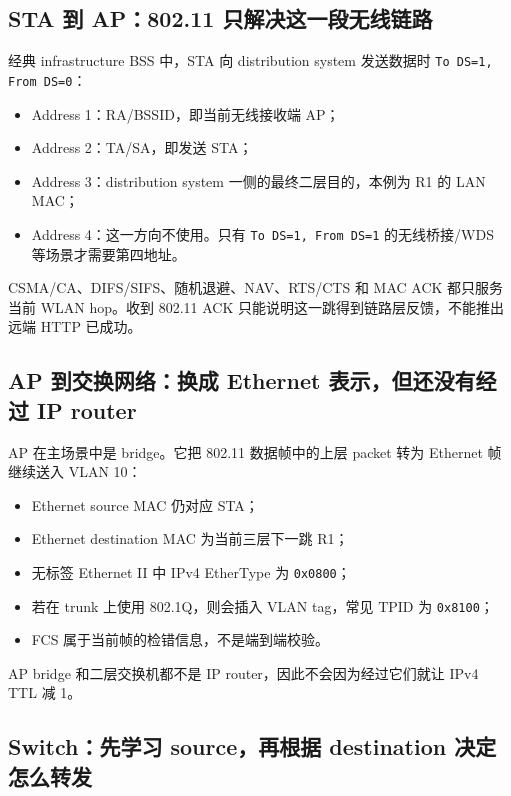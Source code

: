 \documentclass[UTF8,fontset=none,11pt,a4paper]{ctexart}
\begin{document}
\subsection{STA 到 AP：802.11 只解决这一段无线链路}

经典 infrastructure BSS 中，STA 向 distribution system 发送数据时 \texttt{To DS=1, From DS=0}：

\begin{itemize}
  \item Address 1：RA/BSSID，即当前无线接收端 AP；
  \item Address 2：TA/SA，即发送 STA；
  \item Address 3：distribution system 一侧的最终二层目的，本例为 R1 的 LAN MAC；
  \item Address 4：这一方向不使用。只有 \texttt{To DS=1, From DS=1} 的无线桥接/WDS 等场景才需要第四地址。
\end{itemize}

CSMA/CA、DIFS/SIFS、随机退避、NAV、RTS/CTS 和 MAC ACK 都只服务当前 WLAN hop。收到 802.11 ACK 只能说明这一跳得到链路层反馈，不能推出远端 HTTP 已成功。

\subsection{AP 到交换网络：换成 Ethernet 表示，但还没有经过 IP router}

AP 在主场景中是 bridge。它把 802.11 数据帧中的上层 packet 转为 Ethernet 帧继续送入 VLAN 10：

\begin{itemize}
  \item Ethernet source MAC 仍对应 STA；
  \item Ethernet destination MAC 为当前三层下一跳 R1；
  \item 无标签 Ethernet II 中 IPv4 EtherType 为 \texttt{0x0800}；
  \item 若在 trunk 上使用 802.1Q，则会插入 VLAN tag，常见 TPID 为 \texttt{0x8100}；
  \item FCS 属于当前帧的检错信息，不是端到端校验。
\end{itemize}

AP bridge 和二层交换机都不是 IP router，因此不会因为经过它们就让 IPv4 TTL 减 1。

\subsection{Switch：先学习 source，再根据 destination 决定怎么转发}
\end{document}
